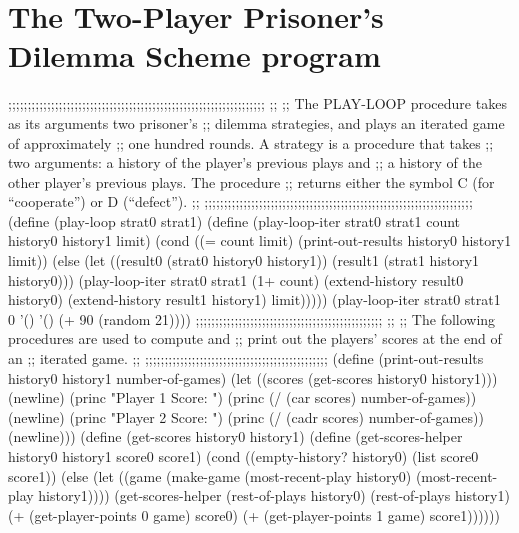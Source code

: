 \vfil
\eject


\section{The Two-Player Prisoner's Dilemma Scheme program}

\beginlisp
;;;;;;;;;;;;;;;;;;;;;;;;;;;;;;;;;;;;;;;;;;;;;;;;;;;;;;;;;;;;;;;;;;
;;
;;  The PLAY-LOOP procedure takes as its arguments two prisoner's 
;;  dilemma strategies, and plays an iterated game of approximately
;;  one hundred rounds. A strategy is a procedure that takes
;;  two arguments: a history of the player's previous plays and 
;;  a history of the other player's previous plays. The procedure 
;;  returns either the symbol C (for ``cooperate'') or D (``defect'').
;;
;;;;;;;;;;;;;;;;;;;;;;;;;;;;;;;;;;;;;;;;;;;;;;;;;;;;;;;;;;;;;;;;;;;;;
\pbrk
(define (play-loop strat0 strat1)
  (define (play-loop-iter strat0 strat1 count history0 history1 limit)
    (cond ((= count limit) (print-out-results history0 history1 limit))
          (else (let ((result0 (strat0 history0 history1))
                      (result1 (strat1 history1 history0)))
                  (play-loop-iter strat0 strat1 (1+ count)
                                  (extend-history result0 history0)
                                  (extend-history result1 history1)
                                  limit)))))
  (play-loop-iter strat0 strat1 0 '() '() (+ 90 (random 21))))
\pbrk
\pbrk
;;;;;;;;;;;;;;;;;;;;;;;;;;;;;;;;;;;;;;;;;;;;;;;;
;;
;; The following procedures are used to compute and
;; print out the players' scores at the end of an
;; iterated game.
;;
;;;;;;;;;;;;;;;;;;;;;;;;;;;;;;;;;;;;;;;;;;;;;;;
\pbrk
(define (print-out-results history0 history1 number-of-games)
  (let ((scores (get-scores history0 history1)))
    (newline)
    (princ "Player 1 Score: ")
    (princ (/ (car scores) number-of-games))
    (newline)
    (princ "Player 2 Score: ")
    (princ (/ (cadr scores) number-of-games))
    (newline)))
\pbrk
\pbrk
(define (get-scores history0 history1)
  (define (get-scores-helper history0 history1 score0 score1)
    (cond ((empty-history? history0) (list score0 score1))
          (else (let ((game (make-game (most-recent-play history0)
                                       (most-recent-play history1))))
                  (get-scores-helper (rest-of-plays history0)
                                     (rest-of-plays history1)
                                     (+ (get-player-points 0 game) score0)
                                     (+ (get-player-points 1 game) score1))))))
